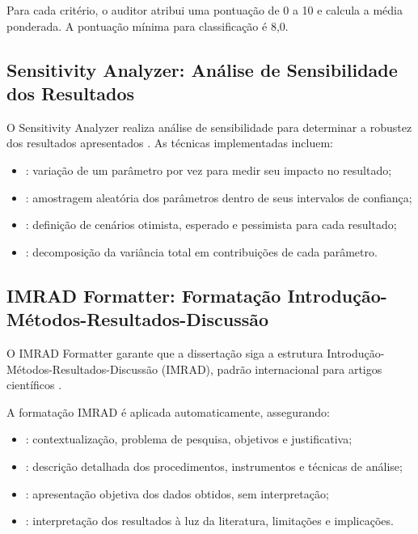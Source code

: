 Para cada critério, o auditor atribui uma pontuação de 0 a 10 e calcula a
média ponderada. A pontuação mínima para classificação \qualisA{} é 8,0.

\subsection{Sensitivity Analyzer: Análise de Sensibilidade dos Resultados}

O Sensitivity Analyzer realiza análise de sensibilidade para determinar a
robustez dos resultados apresentados \cite{box1976science}. As técnicas
implementadas incluem:

\begin{itemize}
\item {}: variação de um parâmetro por vez
      para medir seu impacto no resultado;
\item {}: amostragem aleatória dos parâmetros
      dentro de seus intervalos de confiança;
\item {}: definição de cenários otimista, esperado
      e pessimista para cada resultado;
\item {}: decomposição da variância
      total em contribuições de cada parâmetro.
\end{itemize}

\subsection{IMRAD Formatter: Formatação Introdução-Métodos-Resultados-Discussão}

O IMRAD Formatter garante que a dissertação siga a estrutura Introdução-
Métodos-Resultados-Discussão (IMRAD), padrão internacional para artigos
científicos \cite{sommerville2011engenharia}.

A formatação IMRAD é aplicada automaticamente, assegurando:

\begin{itemize}
\item {}: contextualização, problema de pesquisa,
      objetivos e justificativa;
\item {}: descrição detalhada dos procedimentos,
      instrumentos e técnicas de análise;
\item {}: apresentação objetiva dos dados obtidos, sem
      interpretação;
\item {}: interpretação dos resultados à luz da literatura,
      limitações e implicações.
\end{itemize}

